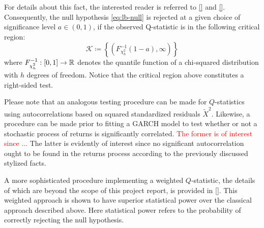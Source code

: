 For details about this fact, the interested reader is referred to \ref{} and \ref{}. %
Consequently, the null hypothesis \eqref{eq:lb-null} is rejected at a given choice of significance level $a\in(0,1)$, if the observed Q-statistic is in the following critical region:
\begin{equation}\label{eq:lb-crit}
    \mathcal{K}\coloneqq\left\{\left(F_{\chi_{h}^{2}}^{-1}(1-a),\infty\right)\right\}
\end{equation}
where $F_{\chi_{h}^{2}}^{-1}:[0,1]\to\mathbb{R}$ denotes the quantile function of a chi-squared distribution with $h$ degrees of freedom. Notice that the critical region above constitutes a right-sided test.

Please note that an analogous testing procedure can be made for $Q$-statistics using autocorrelations based on squared standardized residuals $\tilde{X}^{2}$. Likewise, a procedure can be made prior to fitting a GARCH model to test whether or not a stochastic process of returns is significantly correlated. \textcolor{red}{The former is of interest since ...} The latter is evidently of interest since no significant autocorrelation ought to be found in the returns process according to the previously discussed stylized facts.

A more sophisticated procedure implementing a weighted $Q$-statistic, the details of which are beyond the scope of this project report, is provided in \ref{}. %
This weighted approach is shown to have superior statistical power over the classical approach described above. Here statistical power refers to the probability of correctly rejecting the null hypothesis. %




